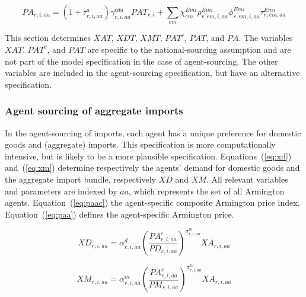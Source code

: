 \documentclass[11pt,letterpaper]{report}
\begin{document}
\begin{equation}
\label{eq:pa}
\mathit{PA_{r,i,aa}} =
   \left( 1 + \tau^a_{r,i,\mathit{aa}} \right)
   \gamma^{\mathit{eda}}_{r,i,\mathit{aa}} \mathit{PAT}_{r,i}
+  \sum_{\mathit{em}} {
      \chi^{\mathit{Emi}}_{\mathit{em}}
      \rho^{\mathit{Emi}}_{r,\mathit{em},i,\mathit{aa}}
      \phi^{\mathit{Emi}}_{r,\mathit{em},i,\mathit{aa}}
      \tau^{\mathit{Emi}}_{r,\mathit{em},\mathit{aa}}
   }
\end{equation}

\noindent This section determines $\mathit{XAT}$, $\mathit{XDT}$,
$\mathit{XMT}$, $\mathit{PAT}^c$, $\mathit{PAT}$, and $\mathit{PA}$. The variables $\mathit{XAT}$,
$\mathit{PAT}^c$,
and $\mathit{PAT}$ are specific to the national-sourcing assumption and are not
part of the model specification in the case of agent-sourcing. The other
variables are included in the agent-sourcing specification, but have an
alternative specification.

\subsubsection{Agent sourcing of aggregate imports}

In the agent-sourcing of imports, each agent has a unique preference for
domestic goods and (aggregate) imports. This specification is more
computationally intensive, but is likely to be a more plausible specification.
Equations~(\ref{eq:xd}) and~(\ref{eq:xm}) determine respectively the agents'
demand for domestic goods and the aggregate import bundle, respectively
$\mathit{XD}$ and $\mathit{XM}$. All relevant variables and parameters are
indexed by $\mathit{aa}$, which represents the set of all Armington agents.
Equation~(\ref{eq:paac}) the agent-specific composite Armington price index.
Equation~(\ref{eq:paa}) defines the agent-specific Armington price.

\begin{equation}
\label{eq:xd}
\mathit{XD}_{r,i,\mathit{aa}} =
   \alpha^{\mathit{d}}_{r,i,\mathit{aa}}
   \left( \frac {\mathit{PA}^c_{r,i,\mathit{aa}}} {\mathit{PD}_{r,i,\mathit{aa}}}
   \right)^{\sigma^{\mathit{m}}_{r,\mathit{i},\mathit{aa}}}
   \mathit{XA}_{r,i,aa}
\end{equation}

\begin{equation}
\label{eq:xm}
\mathit{XM}_{r,i,\mathit{aa}} =
   \alpha^{\mathit{m}}_{r,i,\mathit{aa}}
   \left( \frac {\mathit{PA}^c_{r,i,\mathit{aa}}} {\mathit{PM}_{r,i,\mathit{aa}}}
   \right)^{\sigma^{\mathit{m}}_{r,\mathit{i},\mathit{\mathit{aa}}}}
   \mathit{XA}_{r,i,\mathit{aa}}
\end{equation}
\end{document}
